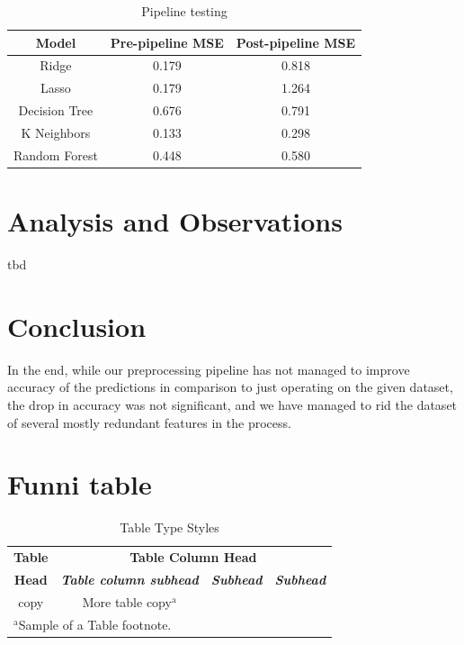 \documentclass[conference]{IEEEtran}
\begin{document}
\begin{table}[htbp]
	\caption{Pipeline testing}
	\begin{center}
		\begin{tabular}{|c|c|c|}
			\hline
			\textbf{Model}&\textbf{Pre-pipeline MSE}&\textbf{Post-pipeline MSE}\\
			\hline
			Ridge&0.179&0.818 \\
			\hline
			Lasso&0.179&1.264 \\
			\hline
			Decision Tree&0.676&0.791 \\
			\hline
			K Neighbors&0.133&0.298 \\
			\hline
			Random Forest&0.448&0.580 \\
			\hline
		\end{tabular}
		\label{tab1}
	\end{center}
\end{table}

\section{Analysis and Observations}
tbd

\section{Conclusion}

In the end, while our preprocessing pipeline has not managed to improve accuracy of the predictions in comparison to just operating on the given dataset, the drop in accuracy was not significant, and we have managed to rid the dataset of several mostly redundant features in the process. 




\section{Funni table}

\begin{table}[htbp]
\caption{Table Type Styles}
\begin{center}
\begin{tabular}{|c|c|c|c|}
\hline
\textbf{Table}&\multicolumn{3}{|c|}{\textbf{Table Column Head}} \\
\cline{2-4} 
\textbf{Head} & \textbf{\textit{Table column subhead}}& \textbf{\textit{Subhead}}& \textbf{\textit{Subhead}} \\
\hline
copy& More table copy$^{\mathrm{a}}$& &  \\
\hline
\multicolumn{4}{l}{$^{\mathrm{a}}$Sample of a Table footnote.}
\end{tabular}
\label{tab1}
\end{center}
\end{table}
\end{document}
